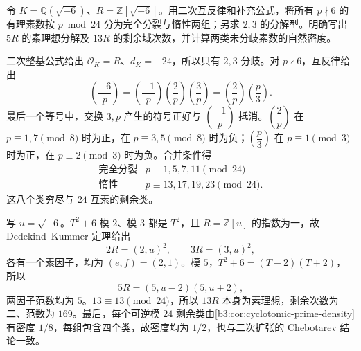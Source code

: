 \begin{exercise}\label{b3:ex:A-minus-six-reciprocity}
	令 \(K=\mathbb Q(\sqrt{-6})\)、\(R=\mathbb Z[\sqrt{-6}]\)。用二次互反律和补充公式，将所有 \(p\nmid6\) 的有理素数按 \(p\bmod24\) 分为完全分裂与惰性两组；另求 \(2,3\) 的分解型。明确写出 \(5R\) 的素理想分解及 \(13R\) 的剩余域次数，并计算两类未分歧素数的自然密度。
\end{exercise}
\begin{solution}
	二次整基公式给出 \(\mathcal O_K=R\)、\(d_K=-24\)，所以只有 \(2,3\) 分歧。对 \(p\nmid6\)，互反律给出
	\[
		\left(\dfrac{-6}p\right)
		=\left(\dfrac{-1}p\right)\left(\dfrac2p\right)\left(\dfrac3p\right)
		=\left(\dfrac2p\right)\left(\dfrac p3\right).
	\]
	最后一个等号中，交换 \(3,p\) 产生的符号正好与 \(\left(\dfrac{-1}p\right)\) 抵消。\(\left(\dfrac2p\right)\) 在 \(p\equiv1,7\pmod8\) 时为正，在 \(p\equiv3,5\pmod8\) 时为负；\(\left(\dfrac p3\right)\) 在 \(p\equiv1\pmod3\) 时为正，在 \(p\equiv2\pmod3\) 时为负。合并条件得
	\[
		\begin{array}{c|c}
			\text{完全分裂}&p\equiv1,5,7,11\pmod{24}\\
			\text{惰性}&p\equiv13,17,19,23\pmod{24}.
		\end{array}
	\]
	这八个类穷尽与 \(24\) 互素的剩余类。

	写 \(u=\sqrt{-6}\)。\(T^2+6\) 模 \(2\)、模 \(3\) 都是 \(T^2\)，且 \(R=\mathbb Z[u]\) 的指数为一，故 Dedekind--Kummer 定理给出
	\[
		2R=(2,u)^2,\qquad3R=(3,u)^2,
	\]
	各有一个素因子，均为 \((e,f)=(2,1)\)。模 \(5\)，\(T^2+6=(T-2)(T+2)\)，所以
	\[
		5R=(5,u-2)(5,u+2),
	\]
	两因子范数均为 \(5\)。\(13\equiv13\pmod{24}\)，所以 \(13R\) 本身为素理想，剩余次数为二、范数为 \(169\)。最后，每个可逆模 \(24\) 剩余类由\cref{b3:cor:cyclotomic-prime-density}有密度 \(1/8\)，每组包含四个类，故密度均为 \(1/2\)，也与二次扩张的 Chebotarev 结论一致。
\end{solution}


